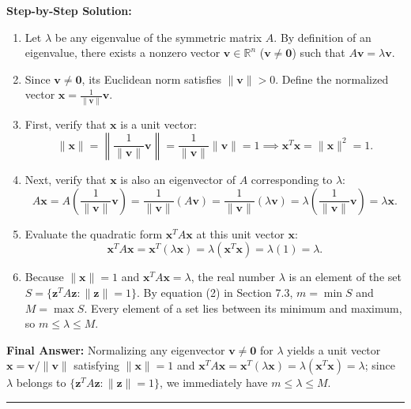 \documentclass[11pt, letterpaper]{article}
\theoremstyle{definition}
\theoremstyle{remark}
\begin{document}
\textbf{Step-by-Step Solution:}
\begin{enumerate}[leftmargin=2em]
    \item Let $\lambda$ be any eigenvalue of the symmetric matrix $A$. By definition of an eigenvalue, there exists a nonzero vector $\mathbf{v} \in \mathbb{R}^n$ ($\mathbf{v} \neq \mathbf{0}$) such that $A\mathbf{v} = \lambda \mathbf{v}$.
    \item Since $\mathbf{v} \neq \mathbf{0}$, its Euclidean norm satisfies $\|\mathbf{v}\| > 0$. Define the normalized vector $\mathbf{x} = \frac{1}{\|\mathbf{v}\|}\mathbf{v}$.
    \item First, verify that $\mathbf{x}$ is a unit vector:
    \[
    \|\mathbf{x}\| = \left\|\frac{1}{\|\mathbf{v}\|}\mathbf{v}\right\| = \frac{1}{\|\mathbf{v}\|}\|\mathbf{v}\| = 1 \implies \mathbf{x}^T \mathbf{x} = \|\mathbf{x}\|^2 = 1.
    \]
    \item Next, verify that $\mathbf{x}$ is also an eigenvector of $A$ corresponding to $\lambda$:
    \[
    A\mathbf{x} = A\left(\frac{1}{\|\mathbf{v}\|}\mathbf{v}\right) = \frac{1}{\|\mathbf{v}\|}(A\mathbf{v}) = \frac{1}{\|\mathbf{v}\|}(\lambda \mathbf{v}) = \lambda \left(\frac{1}{\|\mathbf{v}\|}\mathbf{v}\right) = \lambda \mathbf{x}.
    \]
    \item Evaluate the quadratic form $\mathbf{x}^T A \mathbf{x}$ at this unit vector $\mathbf{x}$:
    \[
    \mathbf{x}^T A \mathbf{x} = \mathbf{x}^T (\lambda \mathbf{x}) = \lambda (\mathbf{x}^T \mathbf{x}) = \lambda(1) = \lambda.
    \]
    \item Because $\|\mathbf{x}\| = 1$ and $\mathbf{x}^T A \mathbf{x} = \lambda$, the real number $\lambda$ is an element of the set $S = \{\mathbf{z}^T A \mathbf{z} : \|\mathbf{z}\| = 1\}$. By equation (2) in Section 7.3, $m = \min S$ and $M = \max S$. Every element of a set lies between its minimum and maximum, so $m \le \lambda \le M$.
\end{enumerate}
\textbf{Final Answer:} Normalizing any eigenvector $\mathbf{v} \neq \mathbf{0}$ for $\lambda$ yields a unit vector $\mathbf{x} = \mathbf{v}/\|\mathbf{v}\|$ satisfying $\|\mathbf{x}\| = 1$ and $\mathbf{x}^T A \mathbf{x} = \mathbf{x}^T (\lambda \mathbf{x}) = \lambda (\mathbf{x}^T \mathbf{x}) = \lambda$; since $\lambda$ belongs to $\{\mathbf{z}^T A \mathbf{z} : \|\mathbf{z}\| = 1\}$, we immediately have $m \le \lambda \le M$.

\medskip
\hrule
\medskip
\end{document}
